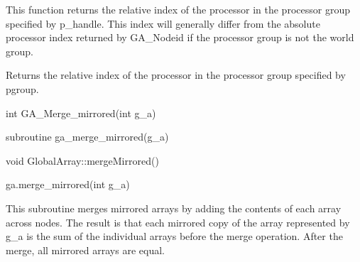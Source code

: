 \documentclass[10pt]{article}
\begin{document}
\local

\begin{desc}
This function returns the relative index of the processor in the processor
group specified by p_handle. This index will generally differ from the absolute
processor index returned by GA_Nodeid if the processor group is not the world
group.

Returns the relative index of the processor in the processor group
specified by pgroup.
\end{desc}



\begin{capi}
\begin{ccode}
int GA_Merge_mirrored(int g_a)
\end{ccode}
\begin{funcargs}
\end{funcargs}
\end{capi}

\begin{fapi}
\begin{fcode}
subroutine ga_merge_mirrored(g_a)
\end{fcode}
\begin{funcargs}
\end{funcargs}
\end{fapi}

\begin{cxxapi}
\begin{cxxcode}
void GlobalArray::mergeMirrored()
\end{cxxcode}
\end{cxxapi}

\begin{pyapi}
\begin{pycode}
ga.merge_mirrored(int g_a)
\end{pycode}
\begin{funcargs}
\end{funcargs}
\end{pyapi}

\gcoll

\begin{desc}
This subroutine merges mirrored arrays by adding the contents of each array
across nodes. The result is that each mirrored copy of the array represented by
g_a is the sum of the individual arrays before the merge operation. After the
merge, all mirrored arrays are equal.
\end{desc}
\end{document}
